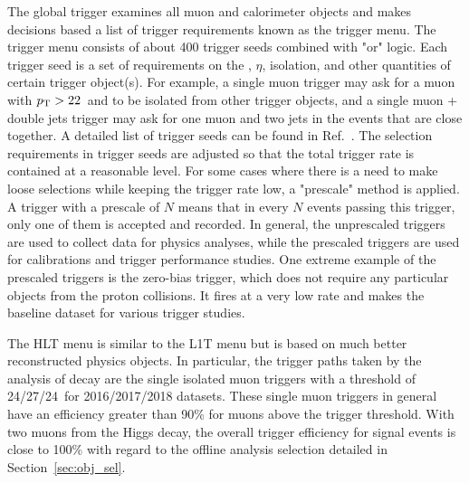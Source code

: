 The global trigger examines all muon and calorimeter objects and makes decisions based a list of trigger requirements known as the trigger menu.
The trigger menu consists of about 400 trigger seeds combined with "or" logic.
Each trigger seed is a set of requirements on the \pt, $\eta$, isolation, and other quantities of certain trigger object(s).
For example, a single muon trigger may ask for a muon with $p_{\mathrm{T}} > 22$~\GeV and to be isolated from other trigger objects, 
and a single muon + double jets trigger may ask for one muon and two jets in the events that are close together.
A detailed list of trigger seeds can be found in Ref.~\cite{l1t_perform}.
The selection requirements in trigger seeds are adjusted so that the total trigger rate is contained at a reasonable level.
For some cases where there is a need to make loose selections while keeping the trigger rate low, a "prescale" method is applied.
A trigger with a prescale of $N$ means that in every $N$ events passing this trigger, only one of them is accepted and recorded.
In general, the unprescaled triggers are used to collect data for physics analyses, 
while the prescaled triggers are used for calibrations and trigger performance studies.
One extreme example of the prescaled triggers is the zero-bias trigger, 
which does not require any particular objects from the proton collisions.
It fires at a very low rate and makes the baseline dataset for various trigger studies.

The HLT menu is similar to the L1T menu but is based on much better reconstructed physics objects.
In particular, the trigger paths taken by the analysis of \hmm decay are the single isolated muon triggers 
with a \pt threshold of 24/27/24~\GeV for 2016/2017/2018 datasets.  
These single muon triggers in general have an efficiency greater than 90\% for muons above the trigger threshold. 
With two muons from the Higgs decay, the overall trigger efficiency for signal events is close to 100\% with regard to the offline analysis selection detailed in Section~\ref{sec:obj_sel}.

